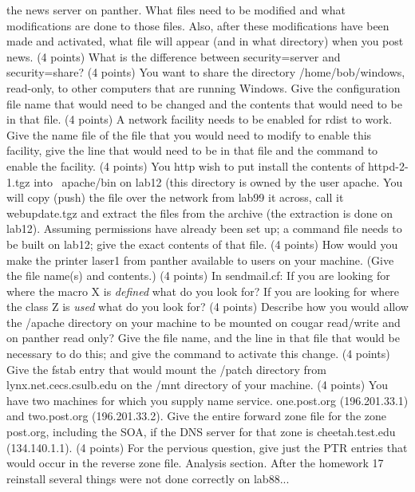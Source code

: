 the news server on {\ltt{}panther}.
What files need to be modified and what modifications are done
to those files.
Also, after these modifications have been made and activated,
what file will appear (and in what directory) when you post news.
\vskip 2.0in
\ques
(4 points)
What is the difference between {\ltt{}security=server}
and {\ltt{}security=share}?
\vskip 1.0in
\ques
(4 points)
You want to share the directory {\ltt{}/home/bob/windows},
read-only, to other computers that are running Windows. 
Give the configuration file name that would need to be
changed and the contents that would need to be in that file.
\vskip 1.0in
\vfill\eject
\ques
(4 points)
A network facility needs to be enabled for {\ltt{}rdist} to work.
Give the name file of the file that you would need to modify to enable this
facility, give the line that would need to be in that file
and the command to enable the facility.
\vskip 2.0in
\ques
(4 points)
You {\ltt{}http} wish to put install the contents
of {\ltt{}httpd-2-1.tgz}
into {\ltt{}~apache/bin} on {\ltt{}lab12}
(this directory is owned by the user {\ltt{}apache}.
You will copy (push) the file over the network from {\ltt{}lab99}
it across, call it {\ltt{}webupdate.tgz} and extract the files from
the archive (the extraction is done on {\ltt{}lab12}).
Assuming permissions have already been set up;
a command file needs to be built on {\ltt{}lab12};
give the exact contents of that file.
\vskip 2.5in
\ques
(4 points)
How would you make the printer {\ltt{}laser1} from
{\ltt{}panther} available to users on your machine.
(Give the file name(s) and contents.)
\vskip 1.0in
\ques
(4 points)
In {\ltt{}sendmail.cf}:
If you are looking for where the macro X is {\it defined} what do you look for?
If you are looking for where the class Z is {\it used} what do you look for?
\vskip 1.0in
\vfill\eject
\ques
(4 points)
Describe how you would allow
the {\ltt{}/apache} directory on your machine to be mounted on
{\ltt{}cougar} read/write
and on {\ltt{}panther} read only?
Give the file name, and the line in that file that would be
necessary to do this; and give the command to activate this change.
\vskip 1.7in
\ques
(4 points)
Give the {\ltt{}fstab} entry that would mount
the {\ltt{}/patch} directory from {\ltt{}lynx.net.cecs.csulb.edu}
on the {\ltt{}/mnt} directory of your machine.
\vskip 0.8in
\ques
(4 points)
You have two machines for which you supply name service.
{\ltt{}one.post.org} (196.201.33.1) and 
{\ltt{}two.post.org} (196.201.33.2).
Give the entire forward zone file for the zone {\ltt{}post.org},
including the SOA, if the DNS server for that zone
is {\ltt{}cheetah.test.edu} ({\ltt{}134.140.1.1}).
\vskip 3.5in
\ques
(4 points)
For the pervious question, give just the {\ltt{}PTR} entries
that would occur in the reverse zone file.
\vfill\eject
Analysis section. After the homework 17 reinstall
several things were not done correctly on {\ltt{}lab88}...

